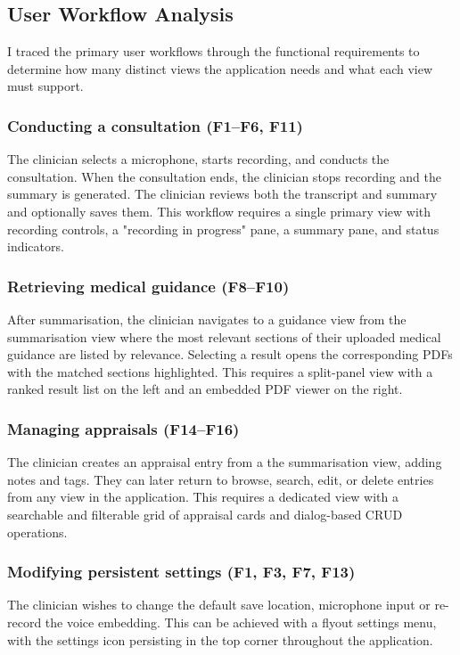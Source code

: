 \subsection{User Workflow Analysis}
I traced the primary user workflows through the functional requirements to determine how many distinct views the application needs and what each view must support.

\subsubsection{Conducting a consultation (F1--F6, F11)}
The clinician selects a microphone, starts recording, and conducts the consultation. When the consultation ends, the clinician stops recording and the summary is generated. The clinician reviews both the transcript and summary and optionally saves them. This workflow requires a single primary view with recording controls, a "recording in progress" pane, a summary pane, and status indicators.

\subsubsection{Retrieving medical guidance (F8--F10)}
After summarisation, the clinician navigates to a guidance view from the summarisation view where the most relevant sections of their uploaded medical guidance are listed by relevance. Selecting a result opens the corresponding PDFs with the matched sections highlighted. This requires a split-panel view with a ranked result list on the left and an embedded PDF viewer on the right.

\subsubsection{Managing appraisals (F14--F16)}
The clinician creates an appraisal entry from a the summarisation view, adding notes and tags. They can later return to browse, search, edit, or delete entries from any view in the application. This requires a dedicated view with a searchable and filterable grid of appraisal cards and dialog-based CRUD operations.

\subsubsection{Modifying persistent settings (F1, F3, F7, F13)}
The clinician wishes to change the default save location, microphone input or re-record the voice embedding. This can be achieved with a flyout settings menu, with the settings icon persisting in the top corner throughout the application. 



